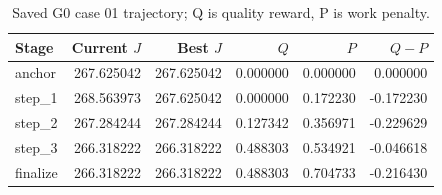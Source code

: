 \begin{table}[t]
\centering
\caption{Saved G0 case 01 trajectory; Q is quality reward, P is work penalty.}
\label{tab:g0-case01}
\begin{tabular}{lrrrrr}
\toprule
Stage & Current $J$ & Best $J$ & $Q$ & $P$ & $Q-P$ \\
\midrule
anchor & 267.625042 & 267.625042 & 0.000000 & 0.000000 & 0.000000 \\
step\_1 & 268.563973 & 267.625042 & 0.000000 & 0.172230 & -0.172230 \\
step\_2 & 267.284244 & 267.284244 & 0.127342 & 0.356971 & -0.229629 \\
step\_3 & 266.318222 & 266.318222 & 0.488303 & 0.534921 & -0.046618 \\
finalize & 266.318222 & 266.318222 & 0.488303 & 0.704733 & -0.216430 \\
\bottomrule
\end{tabular}
\end{table}
